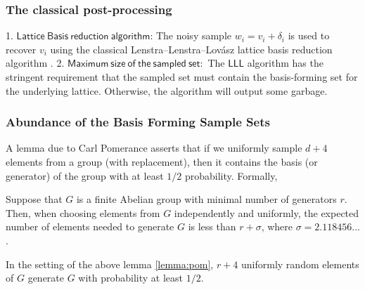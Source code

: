 \documentclass[11pt]{article}
\begin{document}
\subsubsection{The classical post-processing}

1. $\mathsf{Lattice\ Basis\ reduction\ algorithm}$: The noisy sample $w_i=v_i+\delta_i$ is used to recover $v_i$ using the classical Lenstra–Lenstra–Lovász lattice basis reduction algorithm \cite{lenstra1982factoring}.
\vspace{1em}
2. $\mathsf{Maximum\ size\ of\ the\ sampled\ set:}$ The $\mathsf{LLL}$ algorithm has the stringent requirement that the sampled set must contain the basis-forming set for the underlying lattice. Otherwise, the algorithm will output some garbage.



\subsubsection{Abundance of the Basis Forming Sample Sets}

A lemma due to Carl Pomerance \cite{pomerance2002expected} asserts that if we uniformly sample $d+4$ elements from a group (with replacement), then it contains the basis (or generator) of the group with at least $1/2$ probability. Formally,
\begin{lemma}
     Suppose that $G$ is a finite Abelian group with minimal number of generators $r$. Then, when choosing elements from $G$ independently and uniformly, the expected number of elements needed to generate $G$ is less than $r+\sigma$, where $\sigma=2.118456...$.
    \label{lemma:pom}
\end{lemma}

\begin{theorem}
    In the setting of the above lemma \ref{lemma:pom}, $r+4$ uniformly random elements of $G$ generate $G$ with probability at least $1/2$.
\end{theorem}

\end{document}
